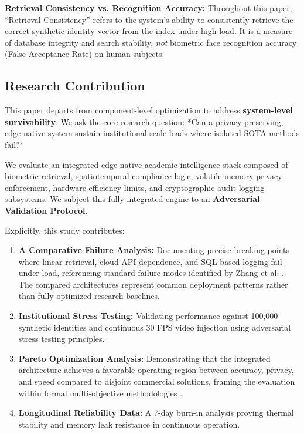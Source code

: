 \documentclass[conference]{IEEEtran}
\begin{document}
\begin{tcolorbox}[colback=yellow!5!white,colframe=yellow!75!black,title=Note on Evaluation Metrics]
\textbf{Retrieval Consistency vs. Recognition Accuracy:} Throughout this paper, ``Retrieval Consistency'' refers to the system's ability to consistently retrieve the correct synthetic identity vector from the index under high load. It is a measure of database integrity and search stability, \textit{not} biometric face recognition accuracy (False Acceptance Rate) on human subjects.
\end{tcolorbox}

\subsection{Research Contribution}
This paper departs from component-level optimization to address \textbf{system-level survivability}. We ask the core research question: *Can a privacy-preserving, edge-native system sustain institutional-scale loads where isolated SOTA methods fail?*

We evaluate an integrated edge-native academic intelligence stack composed of biometric retrieval, spatiotemporal compliance logic, volatile memory privacy enforcement, hardware efficiency limits, and cryptographic audit logging subsystems. We subject this fully integrated engine to an \textbf{Adversarial Validation Protocol}. 

Explicitly, this study contributes:
\begin{enumerate}
    \item \textbf{A Comparative Failure Analysis:} Documenting precise breaking points where linear retrieval, cloud-API dependence, and SQL-based logging fail under load, referencing standard failure modes identified by Zhang et al. \cite{b10}. The compared architectures represent common deployment patterns rather than fully optimized research baselines.
    \item \textbf{Institutional Stress Testing:} Validating performance against 100,000 synthetic identities and continuous 30 FPS video injection using adversarial stress testing principles.
    \item \textbf{Pareto Optimization Analysis:} Demonstrating that the integrated architecture achieves a favorable operating region between accuracy, privacy, and speed compared to disjoint commercial solutions, framing the evaluation within formal multi-objective methodologies \cite{b19}.
    \item \textbf{Longitudinal Reliability Data:} A 7-day burn-in analysis proving thermal stability and memory leak resistance in continuous operation.
\end{enumerate}
\end{document}
